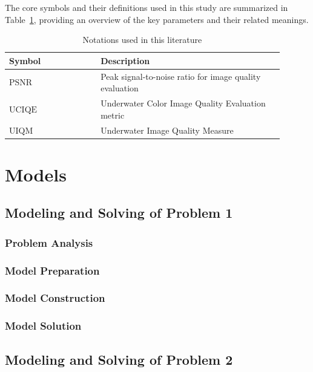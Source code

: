 \documentclass{mcmthesis}
\begin{document}
The core symbols and their definitions used in this study are summarized in Table~\ref{table:notations}, providing an overview of the key parameters and their related meanings.

\begin{table}[ht]
\centering
\caption{Notations used in this literature}
\renewcommand{\arraystretch}{1.5} %
\begin{tabular}{>{\centering\arraybackslash}p{0.3\linewidth} >{\centering\arraybackslash}p{0.6\linewidth}} %
\toprule %
\textbf{Symbol} & \textbf{Description} \\ 
\midrule %

$\text{PSNR}$    & Peak signal-to-noise ratio for image quality evaluation \\

$\text{UCIQE}$   & Underwater Color Image Quality Evaluation metric \\

$\text{UIQM}$    & Underwater Image Quality Measure \\

\bottomrule %
\end{tabular}
\label{table:notations}
\end{table}
\newpage
\section{Models}
\subsection{Modeling and Solving of Problem 1}
\subsubsection{Problem Analysis}
\subsubsection{Model Preparation}
\subsubsection{Model Construction}
\subsubsection{Model Solution}
\subsection{Modeling and Solving of Problem 2}
\end{document}
